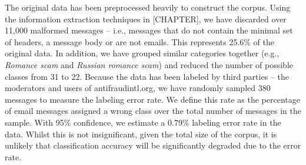 The original data has been preprocessed heavily to construct the corpus. Using the information extraction techniques in [CHAPTER], we have discarded over 11,000 malformed messages -- i.e., messages that do not contain the minimal set of headers, a message body or are not emails. This represents 25.6\% of the original data. In addition, we have grouped similar categories together (e.g., \textit{Romance scam} and \textit{Russian romance scam}) and reduced the number of possible classes from 31 to 22. Because the data has been labeled by third parties -- the moderators and users of antifraudintl.org, we have randomly sampled 380 messages to measure the labeling error rate. We define this rate as the percentage of email messages assigned a wrong class over the total number of messages in the sample. With 95\% confidence, we estimate a 0.79\% labeling error rate in the data. Whilst this is not insignificant, given the total size of the corpus, it is unlikely that classification accuracy will be significantly degraded due to the error rate. 


\begin{table}
  \centering
\end{table} 

